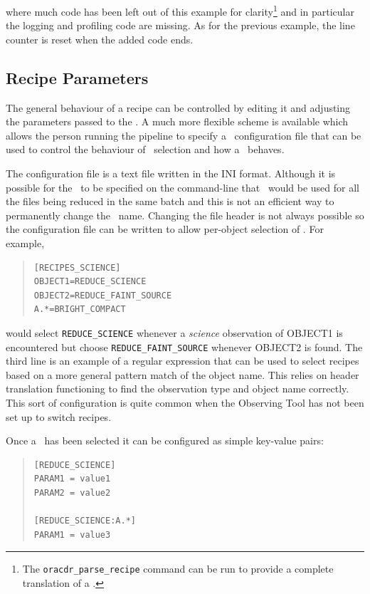 \documentclass[final,authoryear,5p,times,twocolumn]{elsarticle}
\begin{document}
where much code has been left out of this example for
clarity\footnote{The \texttt{oracdr\_parse\_recipe} command can be run
to provide a complete translation of a \recipe.} and in particular the
logging and profiling code are missing. As for the previous example,
the line counter is reset when the added code ends.

\subsection{Recipe Parameters}

The general behaviour of a recipe can be controlled by editing it and
adjusting the parameters passed to the \primitives. A much more
flexible scheme is available which allows the person running the
pipeline to specify a \recipe\ configuration file that can be used to
control the behaviour of \recipe\ selection and how a \recipe\ behaves.

The configuration file is a text file written in the INI
format. Although it is possible for the \recipe\ to be specified on
the command-line that \recipe\ would be used for all the files being
reduced in the same batch and this is not an efficient way to
permanently change the \recipe\ name. Changing the file header is not
always possible so the configuration file can be written to allow
per-object selection of \recipes. For example,

\begin{quote}
\begin{verbatim}
[RECIPES_SCIENCE]
OBJECT1=REDUCE_SCIENCE
OBJECT2=REDUCE_FAINT_SOURCE
A.*=BRIGHT_COMPACT
\end{verbatim}
\end{quote}

would select \texttt{REDUCE\_SCIENCE} whenever a \emph{science}
observation of OBJECT1 is encountered but choose
\texttt{REDUCE\_FAINT\_SOURCE} whenever OBJECT2 is found. The third
line is an example of a regular expression that can be used to select
recipes based on a more general pattern match of the object name. This relies
on header translation functioning to find the observation type and
object name correctly. This sort of configuration is quite common when the
Observing Tool has not been set up to switch recipes.

Once a \recipe\ has been selected it can be configured as simple
key-value pairs:

\begin{quote}
\begin{verbatim}
[REDUCE_SCIENCE]
PARAM1 = value1
PARAM2 = value2

[REDUCE_SCIENCE:A.*]
PARAM1 = value3
\end{verbatim}
\end{quote}
\end{document}
